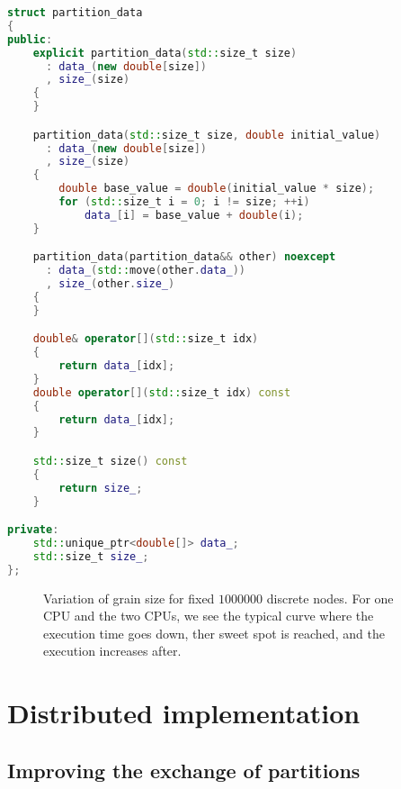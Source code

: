 \begin{lstlisting}[language=c++,caption={Adding the grain size control the futurized one-dimensional heat equation.\label{code:hpx:future:grain}},float,floatplacement=tbp]
struct partition_data
{
public:
    explicit partition_data(std::size_t size)
      : data_(new double[size])
      , size_(size)
    {
    }

    partition_data(std::size_t size, double initial_value)
      : data_(new double[size])
      , size_(size)
    {
        double base_value = double(initial_value * size);
        for (std::size_t i = 0; i != size; ++i)
            data_[i] = base_value + double(i);
    }

    partition_data(partition_data&& other) noexcept
      : data_(std::move(other.data_))
      , size_(other.size_)
    {
    }

    double& operator[](std::size_t idx)
    {
        return data_[idx];
    }
    double operator[](std::size_t idx) const
    {
        return data_[idx];
    }

    std::size_t size() const
    {
        return size_;
    }

private:
    std::unique_ptr<double[]> data_;
    std::size_t size_;
};

\end{lstlisting}

\begin{figure}[tbp]
\centering
{}
\caption{Variation of grain size for fixed $1000000$ discrete nodes. For one CPU and the two CPUs, we see the typical curve where the execution time goes down, ther sweet spot is reached, and the execution increases after. }
\label{fig:scaling:future:grain:size}
\end{figure}



\section{Distributed implementation}

\subsection{Improving the exchange of partitions}


\newpage
\theendnotes
